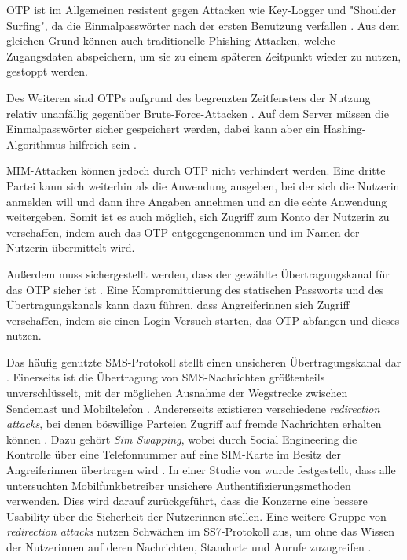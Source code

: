 \ac{OTP} ist im Allgemeinen resistent gegen Attacken wie Key-Logger und "Shoulder Surfing", da die Einmalpasswörter nach der ersten Benutzung verfallen \parencite{abhishekComprehensiveStudy2013}. Aus dem gleichen Grund können auch traditionelle Phishing-Attacken, welche Zugangsdaten abspeichern, um sie zu einem späteren Zeitpunkt wieder zu nutzen, gestoppt werden.

Des Weiteren sind \acp{OTP} aufgrund des begrenzten Zeitfensters der Nutzung relativ unanfällig gegenüber Brute-Force-Attacken \parencite{reeseUsabilityStudy2019}. Auf dem Server müssen die Einmalpasswörter sicher gespeichert werden, dabei kann aber ein Hashing-Algorithmus hilfreich sein \parencite{reeseUsabilityStudy2019}.

\ac{MIM}-Attacken können jedoch durch \ac{OTP} nicht verhindert werden. Eine dritte Partei kann sich weiterhin als die Anwendung ausgeben, bei der sich die Nutzerin anmelden will und dann ihre Angaben annehmen und an die echte Anwendung weitergeben. Somit ist es auch möglich, sich Zugriff zum Konto der Nutzerin zu verschaffen, indem auch das \ac{OTP} entgegengenommen und im Namen der Nutzerin übermittelt wird.

\pskip
Außerdem muss sichergestellt werden, dass der gewählte Übertragungskanal für das \ac{OTP} sicher ist \parencite{abhishekComprehensiveStudy2013}. Eine Kompromittierung des statischen Passworts und des Übertragungskanals kann dazu führen, dass Angreiferinnen sich Zugriff verschaffen, indem sie einen Login-Versuch starten, das \ac{OTP} abfangen und dieses nutzen.

Das häufig genutzte SMS-Protokoll stellt einen unsicheren Übertragungskanal dar \parencite{peetersSMSOTP2022}. Einerseits ist die Übertragung von SMS-Nachrichten größtenteils unverschlüsselt, mit der möglichen Ausnahme der Wegstrecke zwischen Sendemast und Mobiltelefon \parencite{peetersSMSOTP2022}. Andererseits existieren verschiedene \textit{redirection attacks}, bei denen böswillige Parteien Zugriff auf fremde Nachrichten erhalten können \parencite{peetersSMSOTP2022}. Dazu gehört \textit{Sim Swapping}, wobei durch Social Engineering die Kontrolle über eine Telefonnummer auf eine SIM-Karte im Besitz der Angreiferinnen übertragen wird \parencite{leeEmpiricalStudy2020}. In einer Studie von \textcite{leeEmpiricalStudy2020} wurde festgestellt, dass alle untersuchten Mobilfunkbetreiber unsichere Authentifizierungsmethoden verwenden. Dies wird darauf zurückgeführt, dass die Konzerne eine bessere Usability über die Sicherheit der Nutzerinnen stellen. Eine weitere Gruppe von \textit{redirection attacks} nutzen Schwächen im \ac{SS7}-Protokoll aus, um ohne das Wissen der Nutzerinnen auf deren Nachrichten, Standorte und Anrufe zuzugreifen \parencite{ullahSS7Vulnerabilities2020}.

